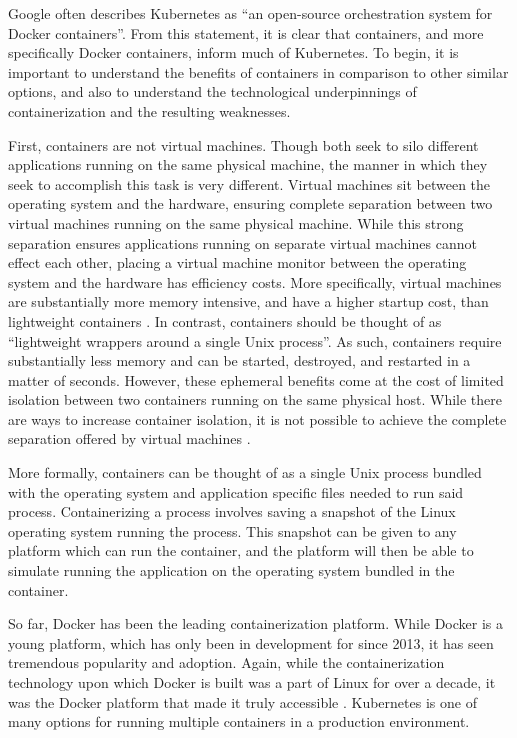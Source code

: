 Google often describes Kubernetes as ``an open-source orchestration system for
Docker containers''\cite{k8s-website}. From this statement, it is clear that
containers, and more specifically Docker containers, inform much of Kubernetes.
To begin, it is important to understand the benefits of containers in comparison
to other similar options, and also to understand the technological underpinnings
of containerization and the resulting weaknesses.

First, containers are not virtual machines. Though both seek to silo different
applications running on the same physical machine, the manner in which they
seek to accomplish this task is very different. Virtual machines sit between the
operating system and the hardware, ensuring complete separation between two
virtual machines running on the same physical machine. While this strong
separation ensures applications running on separate virtual machines cannot
effect each other, placing a virtual machine monitor between the operating
system and the hardware has efficiency costs. More specifically, virtual
machines are substantially more memory intensive, and have a higher startup cost,
than lightweight containers \cite{distributed-systems-principles-and-paradigms}.
In contrast, containers should be thought of as ``lightweight wrappers around a
single Unix process''\cite[pg. 15]{docker-up-and-running}. As such, containers
require substantially less memory and can be started, destroyed, and restarted
in a matter of seconds. However, these ephemeral benefits come at the cost of
limited isolation between two containers running on the same physical host.
While there are ways to increase container isolation, it is not possible to
achieve the complete separation offered by virtual
machines \cite{docker-up-and-running}.

More formally, containers can be thought of as a single Unix process bundled
with the operating system and application specific files needed to run said process.
Containerizing a process involves saving a snapshot of the Linux operating system
running the process. This snapshot can be given to any platform which can run
the container, and the platform will then be able to simulate running the
application on the operating system bundled in the container.

So far, Docker has been the leading containerization platform. While Docker is a
young platform, which has only been in development for since 2013, it has seen
tremendous popularity and adoption. Again, while the containerization technology
upon which Docker is built was a part of Linux for over a decade, it was the
Docker platform that made it truly accessible \cite{docker-up-and-running}.
Kubernetes is one of many options for running multiple containers in a
production environment.
